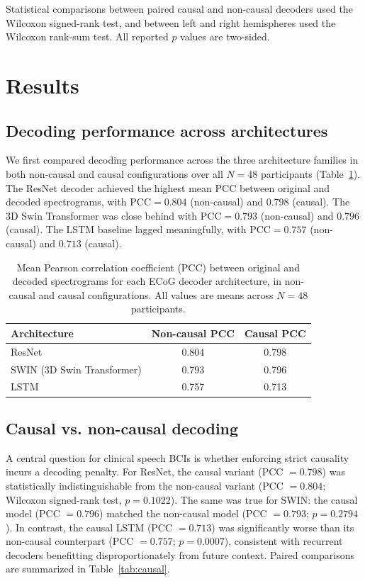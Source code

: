 \documentclass[11pt]{article}
\begin{document}
Statistical comparisons between paired causal and non-causal decoders used the Wilcoxon signed-rank test, and between left and right hemispheres used the Wilcoxon rank-sum test. All reported $p$ values are two-sided.

\section{Results}

\subsection{Decoding performance across architectures}
We first compared decoding performance across the three architecture families in both non-causal and causal configurations over all $N=48$ participants (Table~\ref{tab:arch}). The ResNet decoder achieved the highest mean PCC between original and decoded spectrograms, with $\mathrm{PCC} = 0.804$ (non-causal) and $0.798$ (causal). The 3D Swin Transformer was close behind with $\mathrm{PCC} = 0.793$ (non-causal) and $0.796$ (causal). The LSTM baseline lagged meaningfully, with $\mathrm{PCC} = 0.757$ (non-causal) and $0.713$ (causal).

\begin{table}[h]
\centering
\caption{Mean Pearson correlation coefficient (PCC) between original and decoded spectrograms for each ECoG decoder architecture, in non-causal and causal configurations. All values are means across $N=48$ participants.}
\label{tab:arch}
\begin{tabular}{lcc}
\toprule
Architecture & Non-causal PCC & Causal PCC \\
\midrule
ResNet & 0.804 & 0.798 \\
SWIN (3D Swin Transformer) & 0.793 & 0.796 \\
LSTM & 0.757 & 0.713 \\
\bottomrule
\end{tabular}
\end{table}

\subsection{Causal vs. non-causal decoding}
A central question for clinical speech BCIs is whether enforcing strict causality incurs a decoding penalty. For ResNet, the causal variant (PCC $= 0.798$) was statistically indistinguishable from the non-causal variant (PCC $= 0.804$; Wilcoxon signed-rank test, $p = 0.1022$). The same was true for SWIN: the causal model (PCC $= 0.796$) matched the non-causal model (PCC $= 0.793$; $p = 0.2794$). In contrast, the causal LSTM (PCC $= 0.713$) was significantly worse than its non-causal counterpart (PCC $= 0.757$; $p = 0.0007$), consistent with recurrent decoders benefitting disproportionately from future context. Paired comparisons are summarized in Table~\ref{tab:causal}.
\end{document}
